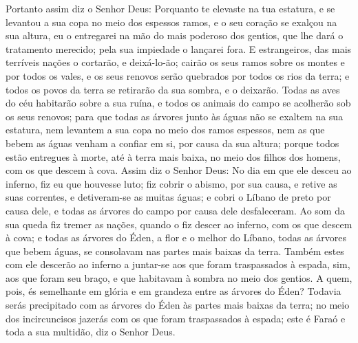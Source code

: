 Portanto assim diz o Senhor Deus: Porquanto te elevaste na tua
estatura, e se levantou a sua copa no meio dos espessos ramos, e o
seu coração se exalçou na sua altura, eu o entregarei na mão
do mais poderoso dos gentios, que lhe dará o tratamento merecido;
pela sua impiedade o lançarei fora. E estrangeiros, das mais
terríveis nações o cortarão, e deixá-lo-ão; cairão os seus ramos
sobre os montes e por todos os vales, e os seus renovos serão
quebrados por todos os rios da terra; e todos os povos da terra se
retirarão da sua sombra, e o deixarão. Todas as aves do céu
habitarão sobre a sua ruína, e todos os animais do campo se
acolherão sob os seus renovos; para que todas as árvores
junto às águas não se exaltem na sua estatura, nem levantem a sua
copa no meio dos ramos espessos, nem as que bebem as águas venham a
confiar em si, por causa da sua altura; porque todos estão entregues
à morte, até à terra mais baixa, no meio dos filhos dos homens, com
os que descem à cova. Assim diz o Senhor Deus: No dia em que
ele desceu ao inferno, fiz eu que houvesse luto; fiz cobrir o
abismo, por sua causa, e retive as suas correntes, e detiveram-se as
muitas águas; e cobri o Líbano de preto por causa dele, e todas as
árvores do campo por causa dele desfaleceram. Ao som da sua
queda fiz tremer as nações, quando o fiz descer ao inferno, com os
que descem à cova; e todas as árvores do Éden, a flor e o melhor do
Líbano, todas as árvores que bebem águas, se consolavam nas partes
mais baixas da terra. Também estes com ele descerão ao
inferno a juntar-se aos que foram traspassados à espada, sim, aos
que foram seu braço, e que habitavam à sombra no meio dos gentios.
A quem, pois, és semelhante em glória e em grandeza entre as
árvores do Éden? Todavia serás precipitado com as árvores do Éden às
partes mais baixas da terra; no meio dos incircuncisos jazerás com
os que foram traspassados à espada; este é Faraó e toda a sua
multidão, diz o Senhor Deus.

\medskip

